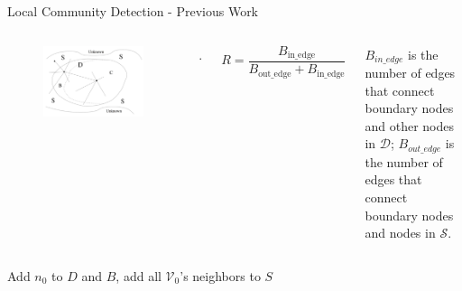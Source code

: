 \documentclass[9pt]{beamer}
\begin{document}
\begin{frame}{Local Community Detection - Previous Work}

\begin{columns}[T,onlytextwidth]
      \begin{figure}
      \centering
      \includegraphics[scale = 0.08]{localCommunityDefinition.jpeg}
      \end{figure}

     .
     
    \begin{equation}
    R = \frac{B_{\text{in\_edge}}}{B_{\text{out\_edge}}+B_{\text{in\_edge}}}
    \end{equation}
    
    ${B}_{in\_edge}$ is the number of edges that connect boundary nodes and other nodes in $\mathcal{D}$;  
    ${B}_{out\_edge}$ is the number of edges that connect boundary nodes and nodes in $\mathcal{S}$. 
    
  \end{columns}

\scriptsize
\begin{algorithm}[H]
  Add $n_0$ to $D$ and $B$, add all $\mathcal{V}_0$'s neighbors to $S$\;
  \caption{Original Local Community Identification Algorithm}
   \end{algorithm}


\end{frame}
\end{document}
